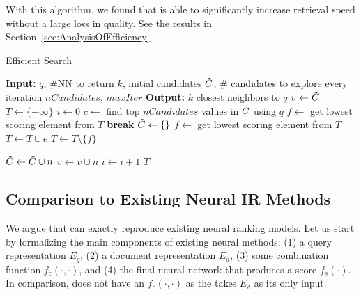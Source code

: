 \documentclass[sigconf,]{acmart}
\begin{document}
With this algorithm, we found that \name{} is able to significantly increase retrieval speed without a large loss in quality. See the results in Section~\ref{sec:AnalysisOfEfficiency}.


\begin{algorithm}
\caption{\name{} Efficient Search}
\label{alg:efficient_search}

\begin{algorithmic}[1]
\Statex \textbf{Input:} \mininame{} $q$, \#NN to return $k$, initial candidates $\Tilde{C}$, \# candidates to explore every iteration $nCandidates$, $maxIter$
\Statex \textbf{Output:} $k$ closest neighbors to $q$
\State $v \leftarrow \Tilde{C}$ 
\State $T \leftarrow \{-\infty\}$ 
\State $i \leftarrow 0$ 
 \label{alg:line:4}
    \State $c \leftarrow$ find top $nCandidates$ values in $\Tilde{C}$ using $q$ \label{alg:line:find_top}
    \State $f \leftarrow$ get lowest scoring element from $T$
        \State \textbf{break}  \label{alg:line:8}
    \EndIf
    \State $\Tilde{C} \leftarrow \{\}$ 
     \label{alg:line:10}
        \State $f \leftarrow$ get lowest scoring element from $T$
         \label{alg:line:12}
            \State $T \leftarrow T \cup e$
                \State $T \leftarrow T \setminus \{f\}$   \label{alg:line:15}
            \EndIf
        \EndIf

         \label{alg:line:16}
                \State $\Tilde{C} \leftarrow \Tilde{C} \cup n$
                \State $v \leftarrow v \cup n$ \label{alg:line:19}
            \EndIf
        \EndFor
    \EndFor
    \State $i \leftarrow i + 1$
\EndWhile
\State \Return $T$
\end{algorithmic}
\end{algorithm}

\subsection{Comparison to Existing Neural IR Methods} \label{sec:ComparisonExistingNeuralScoring}

We argue that \name{} can exactly reproduce existing neural ranking models.
Let us start by formalizing the main components of existing neural methods: (1) a query representation $E_q$, (2) a document representation $E_d$, (3) some combination function $f_c(\cdot, \cdot)$, and (4) the final neural network that produces a score $f_s(\cdot)$. In comparison, \name{}
does not have an $f_c(\cdot, \cdot)$ as the \mininame{} takes $E_d$ as its only input.
\end{document}
